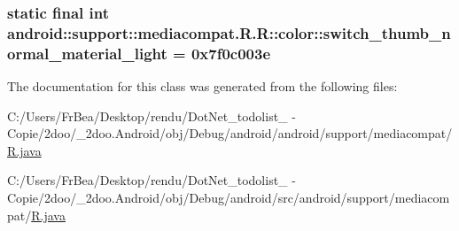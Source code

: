\hypertarget{classandroid_1_1support_1_1mediacompat_1_1_r_1_1color_b4ffa81d6154b0a9ac95874a2bc6dd8d}{
\subsubsection[{switch\_\-thumb\_\-normal\_\-material\_\-light}]{\setlength{\rightskip}{0pt plus 5cm}static final int android::support::mediacompat.R.R::color::switch\_\-thumb\_\-normal\_\-material\_\-light = 0x7f0c003e}}
\label{classandroid_1_1support_1_1mediacompat_1_1_r_1_1color_b4ffa81d6154b0a9ac95874a2bc6dd8d}




The documentation for this class was generated from the following files:\begin{CompactItemize}
\item 
C:/Users/FrBea/Desktop/rendu/DotNet\_\-todolist\_ - Copie/2doo/\_\-2doo.Android/obj/Debug/android/android/support/mediacompat/\hyperlink{android_2support_2mediacompat_2_r_8java}{R.java}\item 
C:/Users/FrBea/Desktop/rendu/DotNet\_\-todolist\_ - Copie/2doo/\_\-2doo.Android/obj/Debug/android/src/android/support/mediacompat/\hyperlink{src_2android_2support_2mediacompat_2_r_8java}{R.java}\end{CompactItemize}
